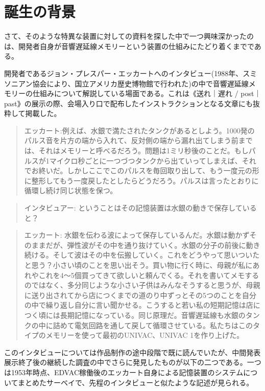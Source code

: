\documentclass[a4paper,report]{jsbook}
\begin{document}
\section{誕生の背景}\label{ux8a95ux751fux306eux80ccux666f}

さて、そのような特異な装置に対しての資料を探した中で一つ興味深かったのは、開発者自身が音響遅延線メモリーという装置の仕組みにたどり着くまでである。

開発者であるジョン・プレスパー・エッカートへのインタビュー(1988年、スミソニアン協会により、国立アメリカ歴史博物館で行われた)の中で音響遅延線メモリーの仕組みについて解説している場面である。これは《送れ｜遅れ
/
post｜past》の展示の際、会場入り口で配布したインストラクションとなる文章にも抜粋して掲載した。

\begin{quote}
エッカート:例えば、水銀で満たされたタンクがあるとしよう。1000発のパルス音を片方の端から入れて、反対側の端から漏れ出てしまう前までは、それはメモリーと呼べるだろう。問題は1ミリ秒後のことだ。もしパルスが1マイクロ秒ごとに一つづつタンクから出ていってしまえば、それでお終いだ。しかしここでこのパルスを毎回取り出して、もう一度元の形に整形してもう一度戻したとしたらどうだろう。パルスは言ったとおりに循環し続け同じ状態を保つ。
\end{quote}

\begin{quote}
インタビュアー: ということはその記憶装置は水銀の動きで保存していると？
\end{quote}

\begin{quote}
エッカート:
水銀を伝わる波によって保存しているんだ。水銀は動かずそのままだが、弾性波がその中を通り抜けていく。水銀の分子の前後に動き続ける。そして波はその中を伝搬していく。これをどうやって思いついたと思う？小さい頃のことを思い出そう。買い物に行く時に、母親が私にあれやこれを4〜5個買ってきて欲しいと頼んでくる。それを書いてメモするのではなく、多分同じような小さい子供はみんなそうすると思うが、母親に送り出されてから店につくまでの道のり中ずっとその5つのことを自分の中で繰り返し自分に言い聞かせる。こうすると若い私の短期記憶は店につく頃には長期記憶になっている。同じ原理だ。音響遅延線も水銀のタンクの中に詰めて電気回路を通して戻して循環させている。私たちはこのタイプのメモリーを使って最初のUNIVAC、UNIVAC
1を作り上げた。
\end{quote}

\autocite[筆者訳]{eckertinterview}

このインタビューについては作品制作の途中段階で既に読んでいたが、中間発表展示終了後の継続した調査の中でさらに発見したものが以下の二つである。一つは1953年時点、EDVAC稼働後のエッカート自身による記憶装置のシステムについてまとめたサーベイで、先程のインタビューと似たような記述が見られる。
\end{document}
